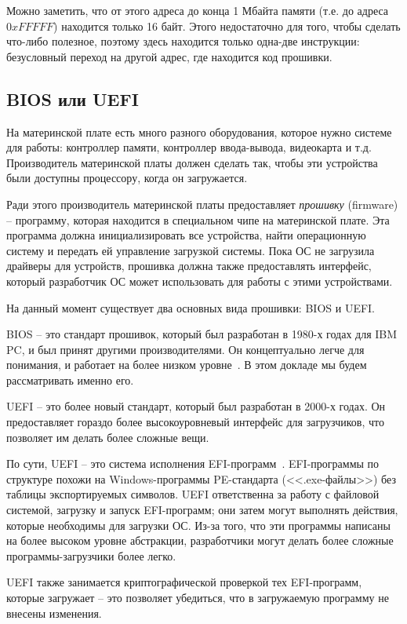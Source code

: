 \documentclass[a4page]{article}
\begin{document}
Можно заметить, что от этого адреса до конца 1 Мбайта памяти
(т.е. до адреса $0xFFFFF$)
находится только 16 байт.
Этого недостаточно для того, чтобы сделать что-либо полезное,
поэтому здесь находится только одна-две инструкции:
безусловный переход на другой адрес, где находится код прошивки.


\subsection{BIOS или UEFI}

На материнской плате есть много разного оборудования,
которое нужно системе для работы:
контроллер памяти, контроллер ввода-вывода, видеокарта и т.д.
Производитель материнской платы должен сделать так, чтобы эти устройства были доступны процессору, когда он загружается.

Ради этого производитель материнской платы предоставляет \emph{прошивку} (firmware) --
программу, которая находится в специальном чипе на материнской плате.
Эта программа должна инициализировать все устройства,
найти операционную систему и передать ей управление загрузкой системы.
Пока ОС не загрузила драйверы для устройств, прошивка должна
также предоставлять интерфейс,
который разработчик ОС может использовать для работы с этими устройствами.

На данный момент существует два основных вида прошивки:
BIOS и UEFI.

BIOS -- это стандарт прошивок, который был разработан в 1980-х годах
для IBM PC, и был принят другими производителями.
Он концептуально легче для понимания, и работает на более низком уровне~\cite{osdev:bios}.
В этом докладе мы будем рассматривать именно его.

UEFI -- это более новый стандарт, который был разработан в 2000-х годах.
Он предоставляет гораздо более высокоуровневый интерфейс для загрузчиков,
что позволяет им делать более сложные вещи.

По сути, UEFI -- это система исполнения EFI-программ~\cite{osdev:uefi}.
EFI-программы по структуре похожи на Windows-программы PE-стандарта (<<.exe-файлы>>)
без таблицы экспортируемых символов.
UEFI ответственна за работу с файловой системой, загрузку и запуск EFI-программ;
они затем могут выполнять действия, которые необходимы для загрузки ОС.
Из-за того, что эти программы написаны на более высоком уровне абстракции,
разработчики могут делать более сложные программы-загрузчики более легко.

UEFI также занимается криптографической проверкой тех EFI-программ,
которые загружает -- это позволяет убедиться, что в загружаемую программу
не внесены изменения.
\end{document}
